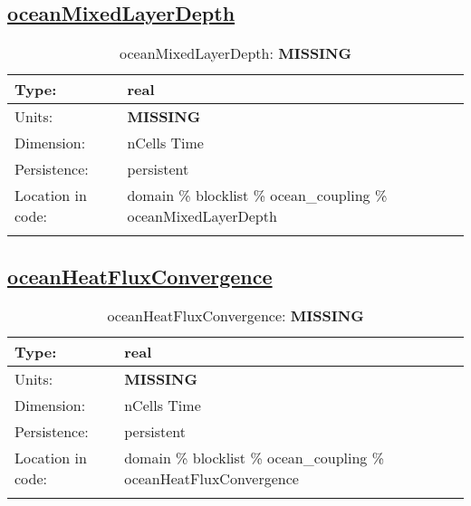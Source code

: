 \subsection[oceanMixedLayerDepth]{\hyperref[sec:var_tab_ocean_coupling]{oceanMixedLayerDepth}}
\label{subsec:var_sec_ocean_coupling_oceanMixedLayerDepth}
\begin{center}
\begin{longtable}{| p{2.0in} | p{4.0in} |}
        \hline 
        Type: & real \\
        \hline 
        Units: & {\bf \color{red} MISSING} \\
        \hline 
        Dimension: & nCells Time \\
        \hline 
        Persistence: & persistent \\
        \hline 
         Location in code: & domain \% blocklist \% ocean\_coupling \% oceanMixedLayerDepth \\
         \hline 
    \caption{oceanMixedLayerDepth: {\bf \color{red} MISSING}}
\end{longtable}
\end{center}
\subsection[oceanHeatFluxConvergence]{\hyperref[sec:var_tab_ocean_coupling]{oceanHeatFluxConvergence}}
\label{subsec:var_sec_ocean_coupling_oceanHeatFluxConvergence}
\begin{center}
\begin{longtable}{| p{2.0in} | p{4.0in} |}
        \hline 
        Type: & real \\
        \hline 
        Units: & {\bf \color{red} MISSING} \\
        \hline 
        Dimension: & nCells Time \\
        \hline 
        Persistence: & persistent \\
        \hline 
         Location in code: & domain \% blocklist \% ocean\_coupling \% oceanHeatFluxConvergence \\
         \hline 
    \caption{oceanHeatFluxConvergence: {\bf \color{red} MISSING}}
\end{longtable}
\end{center}
